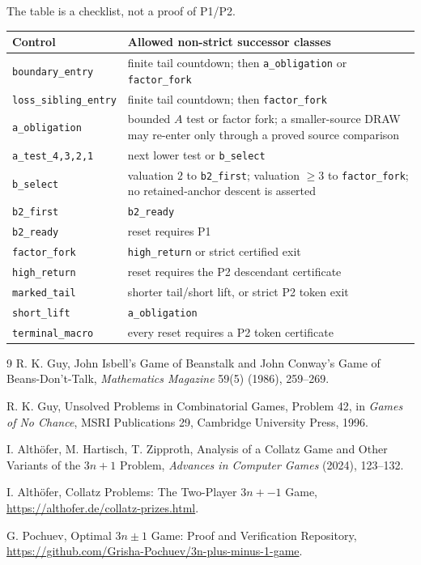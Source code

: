The table is a checklist, not a proof of P1/P2.
\begin{center}
\small
\begin{tabular}{@{}p{.25\linewidth}p{.61\linewidth}@{}}
\toprule
Control & Allowed non-strict successor classes \\
\midrule
\texttt{boundary\_entry} & finite tail countdown; then
  \texttt{a\_obligation} or \texttt{factor\_fork} \\
\texttt{loss\_sibling\_entry} & finite tail countdown; then
  \texttt{factor\_fork} \\
\texttt{a\_obligation} & bounded $A$ test or factor fork; a smaller-source
  DRAW may re-enter only through a proved source comparison \\
\texttt{a\_test\_4,3,2,1} & next lower test or \texttt{b\_select} \\
\texttt{b\_select} & valuation $2$ to \texttt{b2\_first}; valuation
  $\ge3$ to \texttt{factor\_fork}; no retained-anchor descent is asserted \\
\texttt{b2\_first} & \texttt{b2\_ready} \\
\texttt{b2\_ready} & reset requires P1 \\
\texttt{factor\_fork} & \texttt{high\_return} or strict certified exit \\
\texttt{high\_return} & reset requires the P2 descendant certificate \\
\texttt{marked\_tail} & shorter tail/short lift, or strict P2 token exit \\
\texttt{short\_lift} & \texttt{a\_obligation} \\
\texttt{terminal\_macro} & every reset requires a P2 token certificate \\
\bottomrule
\end{tabular}
\end{center}

\begin{thebibliography}{9}
R. K. Guy, John Isbell's Game of Beanstalk and John Conway's Game of
Beans-Don't-Talk, \emph{Mathematics Magazine} 59(5) (1986), 259--269.

R. K. Guy, Unsolved Problems in Combinatorial Games, Problem 42, in
\emph{Games of No Chance}, MSRI Publications 29, Cambridge University Press,
1996.

I. Alth\"ofer, M. Hartisch, T. Zipproth, Analysis of a Collatz Game and Other
Variants of the $3n+1$ Problem, \emph{Advances in Computer Games} (2024),
123--132.

I. Alth\"ofer, Collatz Problems: The Two-Player $3n+-1$ Game,
\url{https://althofer.de/collatz-prizes.html}.

G. Pochuev, Optimal $3n\pm1$ Game: Proof and Verification Repository,
\url{https://github.com/Grisha-Pochuev/3n-plus-minus-1-game}.
\end{thebibliography}


